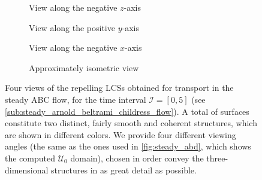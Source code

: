 \begin{figure}[htpb]
    \centering
    \hspace*{\fill}
    \begin{subfigure}[b]{0.42\textwidth}
        \centering
        \caption[]{{\small View along the negative $z$-axis}}
        \label{fig:steady_lcss_z}
    \end{subfigure}\hfill%
    \begin{subfigure}[b]{0.42\textwidth}
        \centering
        \caption[]{{\small View along the positive $y$-axis}}
        \label{fig:steady_lcss_y}
    \end{subfigure}%
    \hspace*{\fill}

    \hspace*{\fill}
    \begin{subfigure}[b]{0.42\textwidth}
        \centering
        \caption[]{{\small View along the negative $x$-axis}}
        \label{fig:steady_lcss_x}
    \end{subfigure}\hfill%
    \begin{subfigure}[b]{0.42\textwidth}
        \centering
        \caption[]{{\small Approximately isometric view}}
        \label{fig:steady_lcss_isometric}
    \end{subfigure}%
    \hspace*{\fill}
    \caption[Four views of the repelling LCSs obtained for transport in the
    steady ABC \newline{}flow]
    {
        Four views of the repelling LCSs obtained for transport in the steady
        ABC flow, for the time interval $\mathcal{I}=[0,5]$ (see
        \cref{sub:steady_arnold_beltrami_childress_flow}). A total of
         surfaces constitute two distinct, fairly smooth and
        coherent structures, which are shown in different colors. We provide
        four different viewing angles (the same as the ones used in
        \cref{fig:steady_abd}, which shows the computed $\mathcal{U}_{0}$
        domain), chosen in order convey the three-dimensional structures in as
        great detail as possible.
}
    \label{fig:steady_lcss}
\end{figure}

